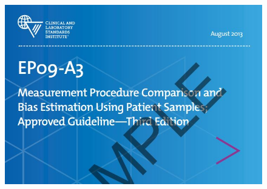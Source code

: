 \documentclass[compress]{beamer}        %
\begin{document}
		\begin{frame}

			\begin{figure}
\centering
\includegraphics[width=0.9\linewidth]{images/CLSI}

\label{fig:CLSI}
\end{figure}

		\end{frame}
		
\end{document}
